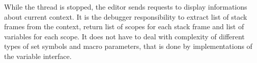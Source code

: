 While the thread is stopped, the editor sends requests to display informations about current context. It is the debugger responsibility to extract list of stack frames from the context, return list of scopes for each stack frame and list of variables for each scope. It does not have to deal with complexity of different types of set symbols and macro parameters, that is done by implementations of the variable interface.


